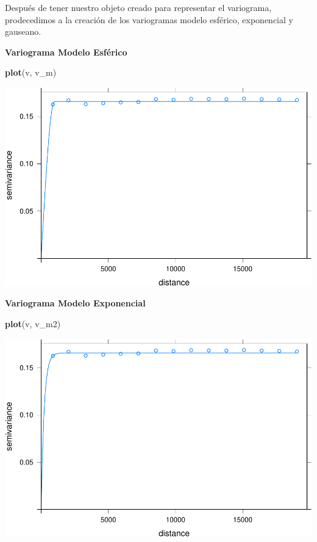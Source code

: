 \documentclass[11pt,]{article}
\newenvironment{Shaded}{\begin{snugshade}}{\end{snugshade}}
\newcommand{\KeywordTok}[1]{\textcolor[rgb]{0.13,0.29,0.53}{\textbf{#1}}}
\newcommand{\NormalTok}[1]{#1}
\begin{document}
Después de tener nuestro objeto creado para representar el variograma,
prodecedimos a la creación de los variogramas modelo esférico,
exponencial y gauseano.

\textbf{Variograma Modelo Esférico}

\begin{Shaded}
\begin{Highlighting}[]
\KeywordTok{plot}\NormalTok{(v, v_m)}
\end{Highlighting}
\end{Shaded}

\includegraphics{proyecto_f_files/figure-latex/unnamed-chunk-47-1.pdf}

\textbf{Variograma Modelo Exponencial}

\begin{Shaded}
\begin{Highlighting}[]
\KeywordTok{plot}\NormalTok{(v, v_m2)}
\end{Highlighting}
\end{Shaded}

\includegraphics{proyecto_f_files/figure-latex/unnamed-chunk-49-1.pdf}
\end{document}
